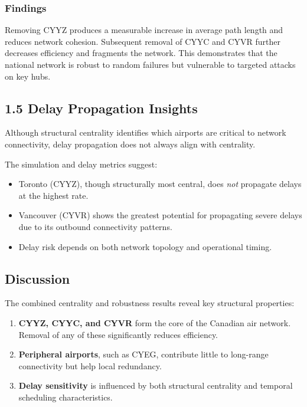 \documentclass[9pt]{article}
\begin{document}
\subsubsection{Findings}

Removing CYYZ produces a measurable increase in average path length and reduces network cohesion. Subsequent removal of CYYC and CYVR further decreases efficiency and fragments the network. This demonstrates that the national network is robust to random failures but vulnerable to targeted attacks on key hubs.

\subsection{1.5 Delay Propagation Insights}

Although structural centrality identifies which airports are critical to network connectivity, delay propagation does not always align with centrality.

The simulation and delay metrics suggest:

\begin{itemize}
    \item Toronto (CYYZ), though structurally most central, does \emph{not} propagate delays at the highest rate.
    \item Vancouver (CYVR) shows the greatest potential for propagating severe delays due to its outbound connectivity patterns.
    \item Delay risk depends on both network topology and operational timing.
\end{itemize}

\subsection{Discussion}

The combined centrality and robustness results reveal key structural properties:

\begin{enumerate}
    \item \textbf{CYYZ, CYYC, and CYVR} form the core of the Canadian air network. Removal of any of these significantly reduces efficiency.
    \item \textbf{Peripheral airports}, such as CYEG, contribute little to long-range connectivity but help local redundancy.
    \item \textbf{Delay sensitivity} is influenced by both structural centrality and temporal scheduling characteristics.
\end{enumerate}
\end{document}
